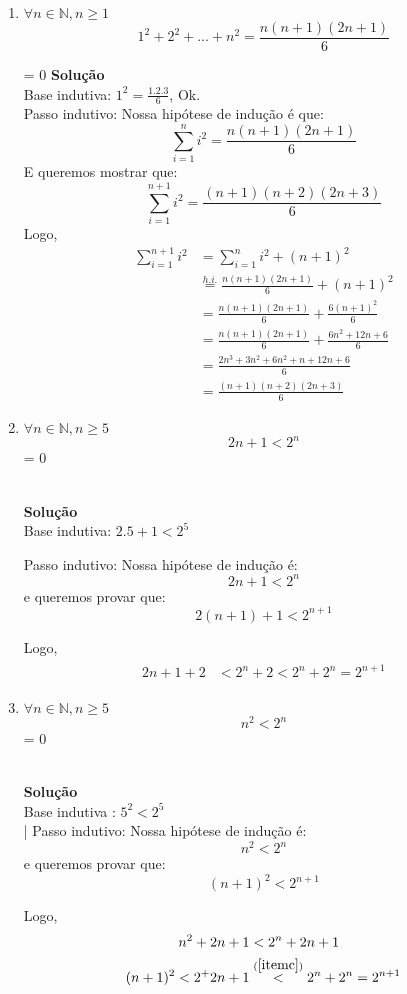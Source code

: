 \documentclass[a4paper]{article}
\newcommand{\answer}[2]{\ifnum#1= 0  {\color{blue} #2}\else \fi}
\begin{document}
\begin{enumerate}
\begin{enumerate}
\item $\forall n \in \mathbb{N}, n \geq 1$ 
  $$1^2 + 2^2 + ... + n^2 = \frac{n(n+1)(2n+1)}{6}$$
  
  \answer{0}{ 
    {\bf Solução} \\
    Base indutiva: $ 1^2 = \frac{1.2.3}{6}$, Ok. \\
    Passo indutivo: Nossa hipótese de indução é que:
    $$\displaystyle\sum_{i=1}^{n}i^2 = \frac{n(n+1)(2n+1)}{6}$$
    E queremos mostrar que:
    $$\displaystyle\sum_{i=1}^{n+1}i^2 = \frac{(n+1)(n+2)(2n+3)}{6}$$
    Logo,
    \[
      \begin{array}{ll}
        \displaystyle\sum_{i=1}^{n+1}i^2
        & = \displaystyle\sum_{i=1}^{n}i^2 + (n+1)^2 \\ 
        & \stackrel{h.i.}{=} \frac{n(n+1)(2n+1)}{6} + (n+1)^2 \\
        & = \frac{n(n+1)(2n+1)}{6} + \frac{6(n+1)^2}{6} \\
        & = \frac{n(n+1)(2n+1)}{6} + \frac{6n^2 +12n + 6}{6} \\
        & = \frac{2n^3 + 3n^2 + 6n^2 + n + 12n + 6}{6} \\
        & = \frac{(n+1)(n+2)(2n+3)}{6}
      \end{array}
    \]	
  }
  
\item $\forall n \in \mathbb{N}, n \geq 5$
  $$2n+1 < 2^n$$ \label{itemc}
  \answer{0}{\\ 
    {\bf Solução} \\
    Base indutiva: $2.5 + 1 < 2^5$ 
    
    Passo indutivo: Nossa hipótese de indução é:
    $$2n + 1 < 2^n$$
    e queremos provar que:
    $$2(n+1)+1 < 2^{n+1}$$
    
    Logo,
    \begin{align*}
      \begin{split}
        2n + 1  + 2 &< 2^n + 2 < 2^n + 2^n = 2^{n+1}
      \end{split}
    \end{align*}
  }
\item $\forall n \in \mathbb{N}, n \geq 5$ 
  $$n^2 < 2^n$$
  \answer{0}{\\ 
    {\bf Solução} \\
    Base indutiva : $5^2 < 2^5$\\|
    Passo indutivo: Nossa hipótese de indução é:
    $$ n^2 < 2^n$$
    e queremos provar que:
    $$ (n+1)^2 < 2^{n+1}$$
    
    Logo,
    \begin{align*}
      \begin{split}
        n^2 + 2n + 1 &< 2^n + 2n + 1\\
        (n+1)^2      < 2^  + 2n + 1 &\stackrel{(\ref{itemc})}{<} 2^n + 2^n = 2^{n+1}
      \end{split}
    \end{align*}
  }
  \end{enumerate}
  

\end{enumerate}
\end{document}
